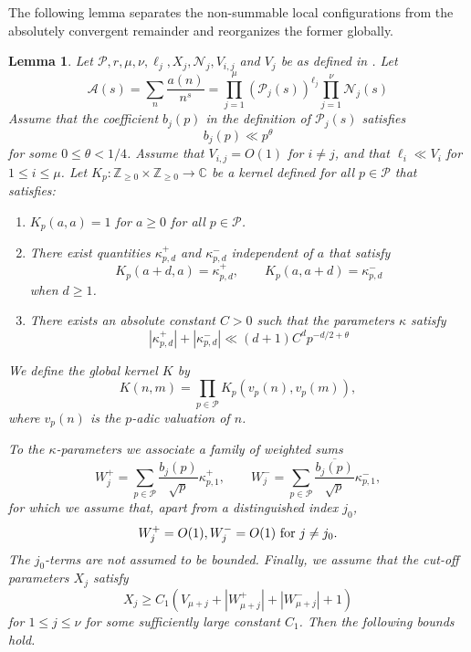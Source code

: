 \documentclass[oneside, 12pt]{amsart}
\newtheorem{lem}[thm]{Lemma}
\theoremstyle{definition}
\begin{document}
	{The following lemma separates the non-summable local configurations from the absolutely convergent remainder and reorganizes the former globally.}
	
	\begin{lem}\label{twistedCombinatorialKernelLemma}
		Let $\mathcal{P}, r, \mu, \nu, \ell_j, X_j, \mathcal{N}_j, V_{i,j}$ and $V_j$ be as defined in . Let $$\mathcal{A}(s)=\sum_{n} \frac{a(n)}{n^s} =\prod_{j=1}^\mu (\mathcal{P}_j(s))^{\ell_j} \prod_{j=1}^{\nu} \mathcal{N}_j(s)$$ 
		Assume that the coefficient $b_j(p)$ in the definition of $\mathcal{P}_j(s)$ satisfies $$b_j(p)\ll p^{\theta}$$ for some $0\leq \theta < 1/4$.
		Assume that ${V_{i,j}}=O(1)$ for $i\neq j$, and that $\ell_{i} \ll V_i$ for $1\leq i \leq \mu$. Let $K_p:\mathbb{Z}_{\geq 0} \times \mathbb{Z}_{\geq 0} \to \mathbb{C}$ be a kernel defined for all $p \in \mathcal{P}$ that satisfies:
		\begin{enumerate}
			\item $K_p(a,a)=1$ for $a\geq 0$ for all $p\in \mathcal{P}$.
			\item There exist quantities $\kappa_{p,d}^+$ and $\kappa_{p,d}^-$ independent of $a$ that satisfy $$K_p(a+d,a)=\kappa_{p,d}^+, \qquad K_p(a,a+d)=\kappa_{p,d}^-$$ when $d\geq 1$.
			\item There exists an absolute constant $C>0$ such that the parameters $\kappa$ satisfy $$|\kappa^{+}_{p,d}|+|\kappa^{-}_{p,d}|\ll (d+1)C^d p^{-d/2+\theta}$$
		\end{enumerate}
		We define the global kernel $K$ by $$K(n,m)=\prod_{p \in \mathcal{P}} K_p(v_p(n),v_p(m)),$$ where $v_p(n)$ is the $p$-adic valuation of $n$. 
		
		To the $\kappa$-parameters we associate a family of weighted sums $$W_j^+= \sum_{p \in \mathcal{P}} \frac{b_j(p)}{\sqrt{p}}\kappa^+_{p,1}, \qquad W_j^- = \sum_{p \in \mathcal{P}} \frac{\overline{b_j(p)}}{\sqrt{p}}\kappa^-_{p,1},$$ for which we assume that, apart from a distinguished index $j_0$, $$W_j^+ = O(1), W_j^- = O(1) \textup{ for } j\neq j_0. $$ The $j_0$-terms are not assumed to be bounded. Finally, we assume that the cut-off parameters $X_j$ satisfy $$X_j \geq C_1(V_{\mu+j}+|W^+_{\mu+j}| + |W^-_{\mu+j}|+1)$$ for $1\leq j \leq \nu$ for some sufficiently large constant $C_1$. 
		Then the following bounds hold.
		

\end{lem}
\end{document}
